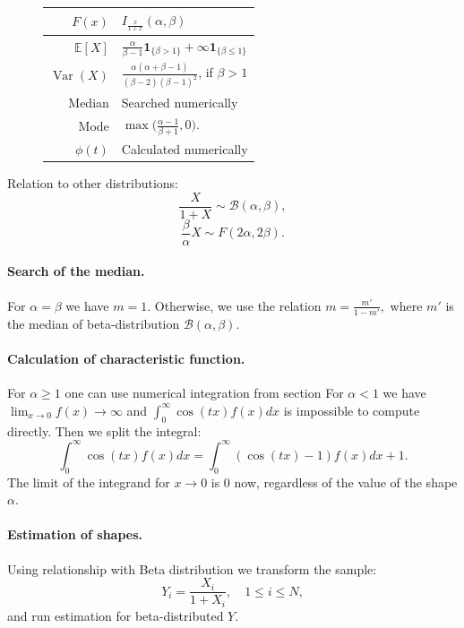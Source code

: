 \documentclass[a4paper,11pt]{article}
\theoremstyle{plain}
\theoremstyle{definition}
\newcommand{\ME}{\mathbb{E}}
\newcommand{\Var}{\operatorname{Var}}
\begin{document}
\begin{figure}[!htb]
\begin{minipage}{0.4\textwidth}
\begin{tabular}{| r | l |}
				\hline
				$F(x)$ & $I_{\frac{x}{1+x}}(\alpha, \beta)$\\
				\hline
				$\ME[X]$ & $ \frac{\alpha}{\beta - 1}\mathbf{1}_{\{\beta > 1 \} } + \infty \mathbf{1}_{\{\beta \leq 1\} } $ \\
				\hline
				$\Var(X)$ & $\frac{ \alpha (\alpha +\beta - 1) }{ (\beta-2)(\beta-1)^2 }$, if $\beta > 1$ \\
				\hline
				Median & Searched numerically \\
				\hline
				Mode & $\max\big( \frac{\alpha-1}{\beta+1}, 0 \big)$. \\
				\hline
				$\phi(t)$ & Calculated numerically \\
				\hline
			\end{tabular}
		\end{minipage}
	\end{figure}
	Relation to other distributions:
	\[\frac{X}{1+X} \sim \mathcal{B}(\alpha, \beta),\]
	\[
	\frac{\beta}{\alpha}X \sim F(2\alpha, 2\beta ).
	\]
	
	\paragraph{Search of the median.} For $\alpha = \beta$ we have $m=1$. Otherwise, we use the relation
	$m = \frac{m'}{1-m'},$
	where $m'$ is the median of beta-distribution $\mathcal{B}(\alpha, \beta)$.
	
	\paragraph{Calculation of characteristic function.} For $\alpha \geq 1$ one can use numerical integration from section %
	For $\alpha < 1$ we have $\lim_{x \rightarrow 0} f(x) \rightarrow \infty$ and $\int_{0}^{\infty} \cos(tx)f(x) dx$ is impossible to compute directly. Then we split the integral:
	\[
	\int_{0}^{\infty} \cos(tx)f(x) dx = \int_{0}^{\infty}(\cos(tx)-1) f(x) dx + 1.
	\]
	The limit of the integrand for $x \rightarrow 0$ is $0$ now, regardless of the value of the shape $\alpha$.
	
	\paragraph{Estimation of shapes.} Using relationship with Beta distribution we transform the sample:
	\[ Y_i = \frac{X_i}{1+X_i}, \quad 1 \leq i \leq N, \]
	and run estimation for beta-distributed $Y$.

	\pagebreak
\end{document}
